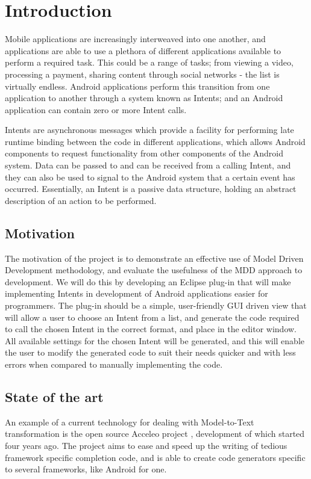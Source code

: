 \section{Introduction}

Mobile applications are increasingly interweaved into one another, and applications are able to use a plethora of different applications available to perform a required task. This could be a range of tasks; from viewing a video, processing a payment, sharing content through social networks - the list is virtually endless. Android applications perform this transition from one application to another through a system known as Intents; and an Android application can contain zero or more Intent calls.

Intents are asynchronous messages which provide a facility for performing late runtime binding between the code in different applications, which allows Android components to request functionality from other components of the Android system. Data can be passed to and can be received from a calling Intent, and they can also be used to signal to the Android system that a certain event has occurred. Essentially, an Intent is a passive data structure, holding an abstract description of an action to be performed. 

\subsection{Motivation}
The motivation of the project is to demonstrate an effective use of Model Driven Development methodology, and evaluate the usefulness of the MDD approach to development. We will do this by developing an Eclipse plug-in that will make implementing Intents in development of Android applications easier for programmers. The plug-in should be a simple, user-friendly GUI driven view that will allow a user to choose an Intent from a list, and generate the code required to call the chosen Intent in the correct format, and place in the editor window. All available settings for the chosen Intent will be generated, and this will enable the user to modify the generated code to suit their needs quicker and with less errors when compared to manually implementing the code.

\subsection{State of the art}
An example of a current technology for dealing with Model-to-Text transformation is the open source Acceleo project \cite{acceleo}, development of which started four years ago. The project aims to ease and speed up the writing of tedious framework specific completion code, and is able to create code generators specific to several frameworks, like Android for one.

